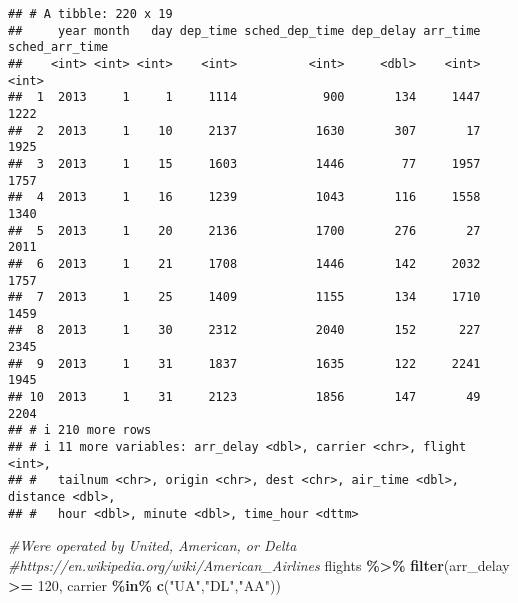 \documentclass[
]{article}
\newenvironment{Shaded}{\begin{snugshade}}{\end{snugshade}}
\newcommand{\CommentTok}[1]{\textcolor[rgb]{0.56,0.35,0.01}{\textit{#1}}}
\newcommand{\DecValTok}[1]{\textcolor[rgb]{0.00,0.00,0.81}{#1}}
\newcommand{\FunctionTok}[1]{\textcolor[rgb]{0.13,0.29,0.53}{\textbf{#1}}}
\newcommand{\NormalTok}[1]{#1}
\newcommand{\SpecialCharTok}[1]{\textcolor[rgb]{0.81,0.36,0.00}{\textbf{#1}}}
\newcommand{\StringTok}[1]{\textcolor[rgb]{0.31,0.60,0.02}{#1}}
\begin{document}
\begin{verbatim}
## # A tibble: 220 x 19
##     year month   day dep_time sched_dep_time dep_delay arr_time sched_arr_time
##    <int> <int> <int>    <int>          <int>     <dbl>    <int>          <int>
##  1  2013     1     1     1114            900       134     1447           1222
##  2  2013     1    10     2137           1630       307       17           1925
##  3  2013     1    15     1603           1446        77     1957           1757
##  4  2013     1    16     1239           1043       116     1558           1340
##  5  2013     1    20     2136           1700       276       27           2011
##  6  2013     1    21     1708           1446       142     2032           1757
##  7  2013     1    25     1409           1155       134     1710           1459
##  8  2013     1    30     2312           2040       152      227           2345
##  9  2013     1    31     1837           1635       122     2241           1945
## 10  2013     1    31     2123           1856       147       49           2204
## # i 210 more rows
## # i 11 more variables: arr_delay <dbl>, carrier <chr>, flight <int>,
## #   tailnum <chr>, origin <chr>, dest <chr>, air_time <dbl>, distance <dbl>,
## #   hour <dbl>, minute <dbl>, time_hour <dttm>
\end{verbatim}

\begin{Shaded}
\begin{Highlighting}[]
  \CommentTok{\#Were operated by United, American, or Delta \#https://en.wikipedia.org/wiki/American\_Airlines}
\NormalTok{  flights }\SpecialCharTok{\%\textgreater{}\%} \FunctionTok{filter}\NormalTok{(arr\_delay }\SpecialCharTok{\textgreater{}=} \DecValTok{120}\NormalTok{, carrier }\SpecialCharTok{\%in\%} \FunctionTok{c}\NormalTok{(}\StringTok{"UA"}\NormalTok{,}\StringTok{"DL"}\NormalTok{,}\StringTok{"AA"}\NormalTok{))}
\end{Highlighting}
\end{Shaded}
\end{document}

